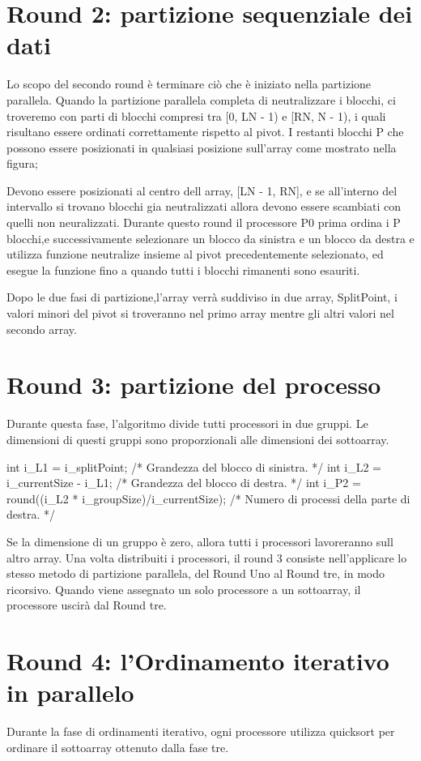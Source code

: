\section{Round 2: partizione sequenziale dei dati} 

Lo scopo del secondo round è terminare ciò che è iniziato nella partizione parallela.
Quando la partizione parallela completa di neutralizzare i blocchi, ci troveremo con parti di blocchi  compresi tra [0, LN - 1) e [RN, N - 1), i quali risultano essere ordinati correttamente rispetto al pivot. I restanti blocchi P che possono essere posizionati in qualsiasi posizione sull'array come mostrato nella figura;



Devono essere posizionati al centro dell array, [LN - 1, RN], e se all'interno del intervallo si trovano blocchi gia neutralizzati allora devono essere scambiati con quelli non neuralizzati. Durante questo  round il processore P0 prima ordina i P blocchi,e successivamente selezionare un blocco da sinistra e un blocco da destra e utilizza funzione neutralize insieme al pivot precedentemente selezionato, ed esegue la funzione fino a quando tutti i blocchi rimanenti sono esauriti.
 
Dopo le due fasi di partizione,l'array verrà suddiviso in due array, SplitPoint, i valori minori del pivot si troveranno nel primo array mentre gli altri valori nel secondo array.


\section{Round 3: partizione del processo}

Durante questa fase, l'algoritmo divide tutti processori in due gruppi.
Le dimensioni di questi gruppi sono proporzionali alle dimensioni dei sottoarray.

  int i\_L1 = i\_splitPoint; /* Grandezza del blocco di sinistra. */
  int i\_L2 = i\_currentSize - i\_L1; /* Grandezza del blocco di destra. */
  int i\_P2 = round((i\_L2 * i\_groupSize)/i\_currentSize); /* Numero di processi della parte di destra. */
    		

Se la dimensione di un gruppo è zero, allora tutti i processori lavoreranno sull altro array.
Una volta distribuiti i processori, il round 3 consiste nell'applicare lo stesso metodo di partizione parallela, del Round Uno al Round tre, in modo ricorsivo.
Quando viene assegnato un solo processore a un sottoarray, il processore uscirà dal Round tre.


\section{Round 4: l'Ordinamento iterativo in parallelo}

Durante la fase di ordinamenti iterativo, ogni processore utilizza quicksort per ordinare il sottoarray ottenuto dalla fase tre. 


